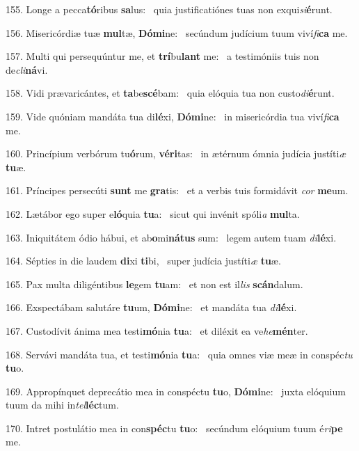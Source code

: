 155. Longe a pecca\textbf{tó}ribus \textbf{sa}lus: \ast\  quia justificatiónes tuas non exqui\textit{si}\textbf{é}runt.\

156. Misericórdiæ tuæ \textbf{mul}tæ, \textbf{Dó}\textbf{mi}ne: \ast\  secúndum judícium tuum viví\textit{fi}\textbf{ca} me.\

157. Multi qui persequúntur me, et \textbf{trí}bu\textbf{lant} me: \ast\  a testimóniis tuis non de\textit{cli}\textbf{ná}vi.\

158. Vidi prævaricántes, et \textbf{ta}be\textbf{scé}bam: \ast\  quia elóquia tua non custo\textit{di}\textbf{é}runt.\

159. Vide quóniam mandáta tua di\textbf{lé}xi, \textbf{Dó}\textbf{mi}ne: \ast\  in misericórdia tua viví\textit{fi}\textbf{ca} me.\

160. Princípium verbórum tu\textbf{ó}rum, \textbf{vé}\textbf{ri}tas: \ast\  in ætérnum ómnia judícia justíti\textit{æ} \textbf{tu}æ.\

161. Príncipes persecúti \textbf{sunt} me \textbf{gra}tis: \ast\  et a verbis tuis formidávit \textit{cor} \textbf{me}um.\

162. Lætábor ego super e\textbf{ló}quia \textbf{tu}a: \ast\  sicut qui invénit spóli\textit{a} \textbf{mul}ta.\

163. Iniquitátem ódio hábui, et ab\textbf{o}mi\textbf{ná}\textbf{tus} sum: \ast\  legem autem tuam \textit{di}\textbf{lé}xi.\

164. Sépties in die laudem \textbf{di}xi \textbf{ti}bi, \ast\  super judícia justíti\textit{æ} \textbf{tu}æ.\

165. Pax multa diligéntibus \textbf{le}gem \textbf{tu}am: \ast\  et non est il\textit{lis} \textbf{scán}dalum.\

166. Exspectábam salutáre \textbf{tu}um, \textbf{Dó}\textbf{mi}ne: \ast\  et mandáta tua \textit{di}\textbf{lé}xi.\

167. Custodívit ánima mea testi\textbf{mó}nia \textbf{tu}a: \ast\  et diléxit ea ve\textit{he}\textbf{mén}ter.\

168. Servávi mandáta tua, et testi\textbf{mó}nia \textbf{tu}a: \ast\  quia omnes viæ meæ in conspéc\textit{tu} \textbf{tu}o.\

169. Appropínquet deprecátio mea in conspéctu \textbf{tu}o, \textbf{Dó}\textbf{mi}ne: \ast\  juxta elóquium tuum da mihi in\textit{tel}\textbf{léc}tum.\

170. Intret postulátio mea in con\textbf{spéc}tu \textbf{tu}o: \ast\  secúndum elóquium tuum é\textit{ri}\textbf{pe} me.\

